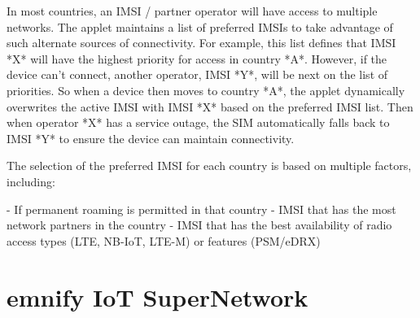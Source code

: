 \documentclass[11pt, oneside]{article}   	%
\newcommand{\addspace}{\vspace{2mm}}
\begin{document}
\begin{markdown}
In most countries, an IMSI / partner operator will have access to multiple networks.
The applet maintains a list of preferred IMSIs to take advantage of such alternate sources of connectivity.
For example, this list defines that IMSI *X* will have the highest priority for access in country *A*.
However, if the device can't connect, another operator, IMSI *Y*, will be next on the list of priorities.
So when a device then moves to country *A*, the applet dynamically overwrites the active IMSI with IMSI *X* based on the preferred IMSI list.
Then when operator *X* has a service outage, the SIM automatically falls back to IMSI *Y* to ensure the device can maintain connectivity.

The selection of the preferred IMSI for each country is based on multiple factors, including:
\end{markdown}
\addspace
\begin{markdown}
- If permanent roaming is permitted in that country
- IMSI that has the most network partners in the country
- IMSI that has the best availability of radio access types (LTE, NB-IoT, LTE-M) or features (PSM/eDRX)
\end{markdown}
\addspace

\section{emnify IoT SuperNetwork}
\end{document}
